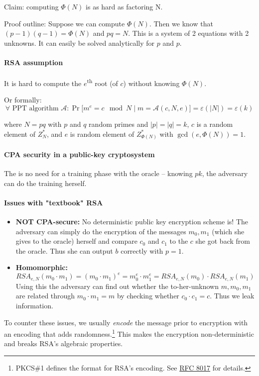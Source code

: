 Claim: computing $\Phi(N)$ is as hard as factoring N.

Proof outline: Suppose we can compute $\Phi(N)$. Then we know that $ (p-1)(q-1) = \Phi(N)$ and $pq = N$. This is a system of 2 equations with 2 unknowns. It can easily be solved analytically for $p$ and $p$.

\paragraph{RSA assumption} It is hard to compute the $e$\textsuperscript{th} root (of $c$) without knowing $\Phi(N)$. 

Or formally: 
$$\forall \text{ PPT algorithm } \mathcal{A}:  \Pr\big[m^e = c \mod N \; | \; m = \mathcal{A}(c, N, e)\big] = \varepsilon(|N|) = \varepsilon(k)$$

where $N = pq$ with $p$ and $q$ random primes and $|p| = |q| = k$, $c$ is a random element of $Z_N^*$, and $e$ is random element of $Z_{\Phi(N)}^*$ with $\gcd(e, \Phi(N))=1$.

\paragraph{CPA security in a public-key cryptosystem}
The is no need for a training phase with the oracle -- knowing $pk$, the adversary can do the training herself.

\paragraph{Issues with "textbook" RSA}
\begin{itemize}
    \item \textbf{NOT CPA-secure:} No deterministic public key encryption scheme is! The adversary can simply do the encryption of the messages $m_0, m_1$ (which she gives to the oracle) herself and compare $c_0$ and $c_1$ to the $c$ she got back from the oracle. Thus she can output $b$ correctly with $p=1$.
    \item \textbf{Homomorphic:} $$ RSA_{e,N}(m_0\cdot m_1) = (m_0\cdot m_1)^e = m_0^e \cdot m_1^e = RSA_{e,N}(m_0) \cdot RSA_{e,N}(m_1) $$
    Using this the adversary can find out whether the to-her-unknown $m, m_0, m_1$ are related through $m_0 \cdot m_1 = m$ by checking whether $c_0 \cdot c_1 = c$. Thus we leak information.
\end{itemize}

To counter these issues, we usually \textit{encode} the message prior to encryption with an encoding that adds randomness.\footnote{PKCS\#1 defines the format for RSA's encoding. See \href{https://tools.ietf.org/html/rfc8017}{RFC 8017} for details.} This makes the encryption non-deterministic and breaks RSA's algebraic properties.

